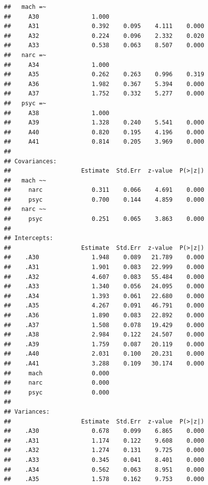 \documentclass[
  english,
  man]{apa6}
\begin{document}
\begin{verbatim}
##   mach =~                                             
##     A30               1.000                           
##     A31               0.392    0.095    4.111    0.000
##     A32               0.224    0.096    2.332    0.020
##     A33               0.538    0.063    8.507    0.000
##   narc =~                                             
##     A34               1.000                           
##     A35               0.262    0.263    0.996    0.319
##     A36               1.982    0.367    5.394    0.000
##     A37               1.752    0.332    5.277    0.000
##   psyc =~                                             
##     A38               1.000                           
##     A39               1.328    0.240    5.541    0.000
##     A40               0.820    0.195    4.196    0.000
##     A41               0.814    0.205    3.969    0.000
## 
## Covariances:
##                    Estimate  Std.Err  z-value  P(>|z|)
##   mach ~~                                             
##     narc              0.311    0.066    4.691    0.000
##     psyc              0.700    0.144    4.859    0.000
##   narc ~~                                             
##     psyc              0.251    0.065    3.863    0.000
## 
## Intercepts:
##                    Estimate  Std.Err  z-value  P(>|z|)
##    .A30               1.948    0.089   21.789    0.000
##    .A31               1.901    0.083   22.999    0.000
##    .A32               4.607    0.083   55.484    0.000
##    .A33               1.340    0.056   24.095    0.000
##    .A34               1.393    0.061   22.680    0.000
##    .A35               4.267    0.091   46.791    0.000
##    .A36               1.890    0.083   22.892    0.000
##    .A37               1.508    0.078   19.429    0.000
##    .A38               2.984    0.122   24.507    0.000
##    .A39               1.759    0.087   20.119    0.000
##    .A40               2.031    0.100   20.231    0.000
##    .A41               3.288    0.109   30.174    0.000
##     mach              0.000                           
##     narc              0.000                           
##     psyc              0.000                           
## 
## Variances:
##                    Estimate  Std.Err  z-value  P(>|z|)
##    .A30               0.678    0.099    6.865    0.000
##    .A31               1.174    0.122    9.608    0.000
##    .A32               1.274    0.131    9.725    0.000
##    .A33               0.345    0.041    8.401    0.000
##    .A34               0.562    0.063    8.951    0.000
##    .A35               1.578    0.162    9.753    0.000

\end{verbatim}
\end{document}
